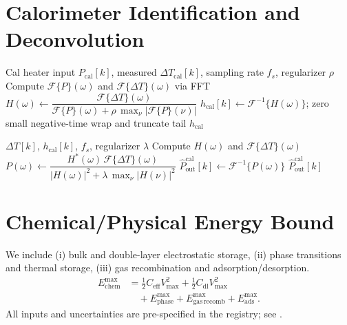 \documentclass[11pt]{article}
\theoremstyle{remark}
\begin{document}
\section{Calorimeter Identification and Deconvolution}
\label{sec:calid}
\begin{algorithm}[H]
\caption{Calorimeter impulse-response identification (frequency-domain)}
\label{alg:ident}
\begin{algorithmic}[1]
\Require Cal heater input $P_{\mathrm{cal}}[k]$, measured $\Delta T_{\mathrm{cal}}[k]$, sampling rate $f_s$, regularizer $\rho$
\State Compute $\mathcal{F}\{P\}(\omega)$ and $\mathcal{F}\{\Delta T\}(\omega)$ via FFT
\State $H(\omega) \gets \dfrac{\mathcal{F}\{\Delta T\}(\omega)}{\mathcal{F}\{P\}(\omega) + \rho\,\max_\nu |\mathcal{F}\{P\}(\nu)|}$ 
\State $h_{\mathrm{cal}}[k] \gets \mathcal{F}^{-1}\{H(\omega)\}$; zero small negative-time wrap and truncate tail
\State \Return $h_{\mathrm{cal}}$
\end{algorithmic}
\end{algorithm}

\begin{algorithm}[H]
\caption{Deconvolution of heat flow}
\label{alg:deconv}
\begin{algorithmic}[1]
\Require $\Delta T[k]$, $h_{\mathrm{cal}}[k]$, $f_s$, regularizer $\lambda$
\State Compute $H(\omega)$ and $\mathcal{F}\{\Delta T\}(\omega)$
\State $P(\omega) \gets \dfrac{H^*(\omega)\,\mathcal{F}\{\Delta T\}(\omega)}{|H(\omega)|^2 + \lambda\,\max_\nu |H(\nu)|^2}$
\State $\widehat P_{\mathrm{out}}^{\mathrm{cal}}[k] \gets \mathcal{F}^{-1}\{P(\omega)\}$
\State \Return $\widehat P_{\mathrm{out}}^{\mathrm{cal}}[k]$
\end{algorithmic}
\end{algorithm}

\section{Chemical/Physical Energy Bound}
\label{sec:chem}
We include (i) bulk and double-layer electrostatic storage, (ii) phase transitions and thermal storage, (iii) gas recombination and adsorption/desorption.
\begin{align}
E_{\mathrm{chem}}^{\max} &= \tfrac{1}{2}C_{\mathrm{eff}}V_{\max}^2 + \tfrac{1}{2}C_{\mathrm{dl}}V_{\max}^2 \\
&\quad + E_{\mathrm{phase}}^{\max} + E_{\mathrm{gas\,recomb}}^{\max} + E_{\mathrm{ads}}^{\max}.
\end{align}
All inputs and uncertainties are pre-specified in the registry; see .
\end{document}
